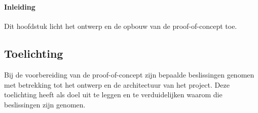 
\chapter{}%
\label{ch:proof-of-concept}

\subsubsection{Inleiding}
Dit hoofdstuk licht het ontwerp en de opbouw van de proof-of-concept toe.

\section{Toelichting}
Bij de voorbereiding van de proof-of-concept zijn bepaalde beslissingen genomen met betrekking tot het ontwerp en de architectuur van het project. Deze toelichting heeft als doel uit te leggen en te verduidelijken waarom die beslissingen zijn genomen.

